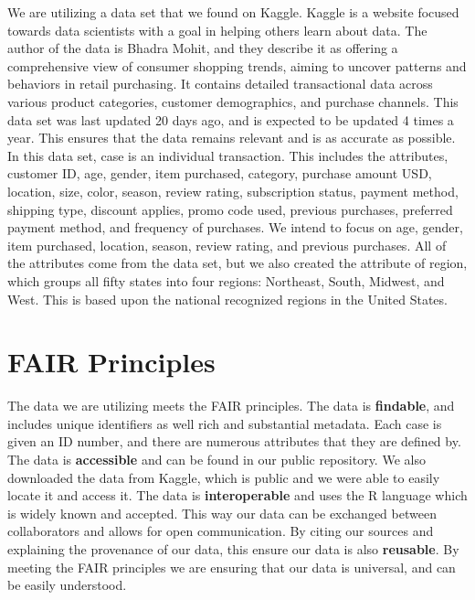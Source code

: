 \documentclass[
  letterpaper,
  DIV=11,
  numbers=noendperiod]{scrartcl}
\begin{document}
We are utilizing a data set that we found on Kaggle. Kaggle is a website
focused towards data scientists with a goal in helping others learn
about data. The author of the data is Bhadra Mohit, and they describe it
as offering a comprehensive view of consumer shopping trends, aiming to
uncover patterns and behaviors in retail purchasing. It contains
detailed transactional data across various product categories, customer
demographics, and purchase channels. This data set was last updated 20
days ago, and is expected to be updated 4 times a year. This ensures
that the data remains relevant and is as accurate as possible. In this
data set, case is an individual transaction. This includes the
attributes, customer ID, age, gender, item purchased, category, purchase
amount USD, location, size, color, season, review rating, subscription
status, payment method, shipping type, discount applies, promo code
used, previous purchases, preferred payment method, and frequency of
purchases. We intend to focus on age, gender, item purchased, location,
season, review rating, and previous purchases. All of the attributes
come from the data set, but we also created the attribute of region,
which groups all fifty states into four regions: Northeast, South,
Midwest, and West. This is based upon the national recognized regions in
the United States.

\section{\texorpdfstring{\textbf{FAIR
Principles}}{FAIR Principles}}\label{fair-principles}

The data we are utilizing meets the FAIR principles. The data is
\textbf{findable}, and includes unique identifiers as well rich and
substantial metadata. Each case is given an ID number, and there are
numerous attributes that they are defined by. The data is
\textbf{accessible} and can be found in our public repository. We also
downloaded the data from Kaggle, which is public and we were able to
easily locate it and access it. The data is \textbf{interoperable} and
uses the R language which is widely known and accepted. This way our
data can be exchanged between collaborators and allows for open
communication. By citing our sources and explaining the provenance of
our data, this ensure our data is also \textbf{reusable}. By meeting the
FAIR principles we are ensuring that our data is universal, and can be
easily understood.
\end{document}
